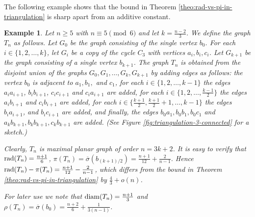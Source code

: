\documentclass[a4paper,11pt]{article}
\newtheorem{example}{Example}[section]
\begin{document}
The following example shows that the bound in Theorem \ref{theo:rad-vs-pi-in-triangulation} 
is sharp apart from an additive constant. 

\begin{example} \label{exa:triangulation-3-connected}
Let $n \geq 5$ with $n\equiv 5 \pmod{6}$ and let $k = \frac{n-2}{3}$. We define the graph $T_n$ as follows. 
Let $G_0$ be the graph consisting of the single vertex $b_0$. 
For each $i \in \{1, 2, \ldots, k\}$, let $G_i$ be a copy of the cycle $C_3$ with vertices $a_i, b_i, c_i$. 
Let $G_{k+1}$ be the graph consisting of a single vertex $b_{k+1}$. The graph $T_n$ is obtained from the 
disjoint union of the graphs $G_0, G_1, \ldots, G_k, G_{k+1}$ by adding edges as follows: 
the vertex $b_0$ is adjacent to $a_1, b_1,$ and $c_1$, 
for each $i \in \{1, 2, \ldots, k-1\}$ the edges $a_i a_{i+1}$, $b_i b_{i+1}$, $c_i c_{i+1}$ and $c_ia_{i+1}$ are added, 
for each $i \in \{1, 2, \ldots, \frac{k-1}{2}\}$ the edges $a_i b_{i+1}$ and $c_i b_{i+1}$ are added, 
for each $i \in \{\frac{k+1}{2}, \frac{k+1}{2}+1, \ldots, k-1\}$ the edges $b_i a_{i+1}$, and $b_i c_{i+1}$ are added, 
and finally, the edges $b_0a_1, b_0b_1, b_0c_1$ and $a_k b_{k+1}, b_k b_{k+1}, c_k b_{k+1}$ are added. 
(See Figure \ref{fig:triangulation-3-connected} for a sketch.)

Clearly, $T_n$ is maximal planar graph of order $n=3k+2$. It is easy to verify that 
${\rm rad}(T_n)= \frac{n+1}{6}$, 
$\pi(T_n) = \overline{\sigma}(b_{(k+1)/2}) = \frac{n+1}{12} + \frac{2}{n-1}$.
Hence ${\rm rad}(T_n) - \pi(T_n) = \frac{n+1}{12} - \frac{2}{n-1}$, which differs from the 
bound in Theorem \ref{theo:rad-vs-pi-in-triangulation} by $\frac{4}{3} + o(n)$.

For later use  we note that ${\rm diam}(T_n)=\frac{n+1}{3}$ and 
$\rho(T_n) = \overline{\sigma}(b_{0}) = \frac{n+2}{6} + \frac{1}{3(n-1)}$. 
\end{example}
\end{document}
